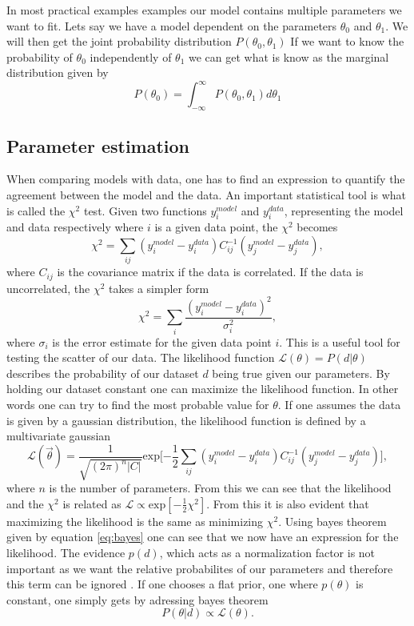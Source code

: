In most practical examples examples our model contains multiple parameters we want to fit. Lets say we have a model
dependent on the parameters $\theta_0$ and $\theta_1$. We will then get the joint probability distribution $P(\theta_0, \theta_1)$
If we want to know the probability of $\theta_0$ independently of $\theta_1$ we can get what is know as the marginal distribution given by
\begin{equation}
    P(\theta_0)=\int_{-\infty}^{\infty}P(\theta_0, \theta_1)d\theta_1
\end{equation}

\subsection{Parameter estimation}
When comparing models with data, one has to find an expression to quantify the
agreement between the model and the data. An important statistical tool is what
is called the $\chi^2$ test. Given two functions $y^{model}_i$ and $y^{data}_i$,
representing the model and data respectively where $i$ is a given data point,
the $\chi^2$ becomes
\begin{equation}
    \chi^2=\sum_{ij}(y^{model}_i-y^{data}_i)C_{ij}^{-1}(y^{model}_j-y^{data}_j),
\end{equation}
where $C_{ij}$ is the covariance matrix if the data is correlated. If the data
is uncorrelated, the $\chi^2$ takes a simpler form
\begin{equation}
    \chi^2=\sum_{i}\frac{(y^{model}_i-y^{data}_i)^2}{\sigma_i^2},
\end{equation}
where $\sigma_i$ is the error estimate for the given data point $i$. This is a
useful tool for testing the scatter of our data. The likelihood function
$\mathcal{L}(\theta)=P(d\vert \theta)$ describes the probability of our dataset
$d$ being true given our parameters. By holding our dataset constant one can
maximize the likelihood function. In other words one can try to find the most
probable value for $\theta$. If one assumes the data is given by a gaussian
distribution, the likelihood function is defined by a multivariate gaussian
\begin{equation}
    \mathcal{L}(\vec{\theta}) = \frac{1}{\sqrt{(2\pi)^n\vert C \vert}}\mathrm{exp}\big[{-\frac{1}{2}}\sum_{ij}(y^{model}_i-y^{data}_i)C_{ij}^{-1}(y^{model}_j-y^{data}_j)\big],
\end{equation}
where $n$ is the number of parameters. From this we can see that the likelihood and the $\chi^2$ is related as
$\mathcal{L}\propto \mathrm{exp}[-\frac{1}{2}\chi^2]$. From this it is also evident that
maximizing the likelihood is the same as minimizing $\chi^2$. Using bayes theorem given by equation
\ref{eq:bayes} one can see that we now have an expression for the likelihood.
The evidence $p(d)$, which acts as a normalization factor is not important as we
want the relative probabilites of our parameters and therefore this term can be
ignored \cite{heavens2010statistical}. If one chooses a flat prior, one where
$p(\theta)$ is constant, one simply gets by adressing bayes theorem
\begin{equation}
    P(\theta\vert d) \propto \mathcal{L}(\theta).
\end{equation}
